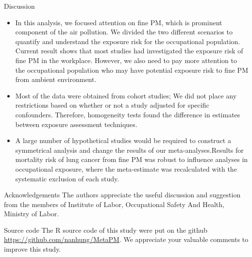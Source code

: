 \documentclass[final,t]{beamer}
\begin{document}
\begin{frame}[fragile]
\begin{columns}[t]
\begin{column}{0.36\linewidth}
      
      \begin{block}{Discussion}
        \begin{itemize}
          \item In this analysis, we focused attention on fine PM, which is prominent component of the air pollution. We divided the two different scenarios to quantify and understand the exposure risk for the occupational population. Current result shows that most studies had investigated the exposure risk of fine PM in the workplace. However, we also need to pay more attention to the occupational population who may have potential exposure risk to fine PM from ambient environment. 
          \item Most of the data were obtained from cohort studies; We did not place any restrictions based on whether or not a study adjusted for specific confounders. Therefore, homogeneity tests found the difference in estimates between exposure assessment techniques.
          \item A large number of hypothetical studies would be required to construct a symmetrical analysis and change the results of our meta-analyses.Results for mortality risk of lung cancer from fine PM was robust to influence analyses in occupational exposure, where the meta-estimate was recalculated with the systematic exclusion of each study.
        \end{itemize}
		\end{block}

      \begin{block}{Acknowledgements}
      The authors appreciate the useful discussion and suggestion from the members of Institute of Labor, Occupational Safety And Health, Ministry of Labor.
		\end{block}


      \begin{block}{Source code}
The R source code of this study were put on the github \url{https://github.com/nanhung/MetaPM}. We appreciate your valuable comments to improve this study.
		\end{block}

    \end{column}%
  \end{columns}

\end{frame}
\end{document}
